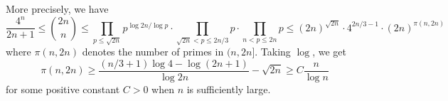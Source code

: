 \documentclass{article}
\def\Z{{\mathbb Z}}
\def\Z{{\mathbb Z}}
\newtheorem{cor}[subsection]{Corollary}
\newenvironment{proof}{\noindent {\bf Proof:}}{$\Box$ \vspace{2 ex}}
\begin{document}
\begin{comment}
Let's now consider the binomial coefficient $\displaystyle\binom{2n}{n}$. For any positive integer $a$, write $(2n)_a$ and $n_a$ for the remainders as last time. We note that if $n_a < a/2$, then $(2n)_a = 2(n_a) \geq n_a$; and if $n_a \geq a/2$, then $(2n)_a = 2(n_a) - a < n_a$. Hence
$$\left\lfloor\frac{2n}{a}\right\rfloor - 2\left\lfloor\frac{n}{a}\right\rfloor = \begin{cases}
        1&\mbox{if }n_a \geq a/2,\\
        0&\mbox{if }n_a < a/2.
    \end{cases}$$

\begin{cor}
    For any positive integer $n$, we have $\displaystyle n+1 \mid \binom{2n}{n}$. The quotients $\displaystyle\frac{1}{n+1}\binom{2n}{n}$ are the Catalan numbers.
\end{cor}

\begin{proof}
    One can prove this directly by checking that
    $$\frac{1}{n+1}\binom{2n}{n} = \binom{2n}{n} - \binom{2n}{n+1} \in\Z.$$
    Alternatively, suppose $\nu_p(n+1) = k$. Then for any $a = p,p^2,\ldots,p^k$, we have $n_a = a - 1\geq a/2$. So $\nu_p(\binom{2n}{n}) \geq k.$
\end{proof}

\begin{cor}
    Let $n\geq3$ and let $p$ be a prime such that $2n/3 < p \leq 2n$. Then
    $$\nu_p\left(\binom{2n}{n}\right) = \begin{cases}
        1&\mbox{if }n < p \leq 2n\\
        0&\mbox{if }2n/3 < p \leq n
    \end{cases}$$
\end{cor}

\begin{proof}
    The statement for $n<p\leq 2n$ is obvious because $\lfloor 2n/p\rfloor = 1$ and $\lfloor n/p\rfloor = 0$. Suppose now $2n/3 < p \leq n$. Then $n-p <3p/2-p = p/2$. So $\lfloor\frac{2n}{p}\rfloor - 2\lfloor\frac{n}{p}\rfloor = 0$. Now $p^2 > 4n^2/9 \geq 2n$ for $n\geq 5.$ When $n = 4$, we have $8/3 < p \leq 4$ and so $p = 3$ and $p^2 > 2n$. When $n = 3$, we have $2 < p \leq 3$ and so $p = 3$ and $p^2 > 2n$. 
\end{proof}

For primes $p \leq 2n/3$, we have the ``trivial'' bound
$$\nu_p\left(\binom{2n}{n}\right) \leq \frac{\log 2n}{\log p}.$$
Note for $\sqrt{2n}<p\leq 2n/3$, we have 
$$\nu_p\left(\binom{2n}{n}\right) \leq \frac{\log 2n}{\log p} < 2\qquad\Longrightarrow\qquad \nu_p\left(\binom{2n}{n}\right) = 1.$$
\end{comment}
More precisely, we have
$$\frac{4^n}{2n+1}\leq \binom{2n}{n} \leq \prod_{p\leq \sqrt{2n}} p^{\log 2n/\log p} \cdot \prod_{\sqrt{2n} < p\leq 2n/3} p\cdot\prod_{n < p \leq 2n}p \leq (2n)^{\sqrt{2n}} \cdot 4^{2n/3-1} \cdot (2n)^{\pi(n,2n)}$$
where $\pi(n,2n)$ denotes the number of primes in $(n, 2n]$. Taking $\log$, we get
$$\pi(n, 2n) \geq \frac{(n/3+1)\log 4 - \log(2n+1)}{\log 2n} - \sqrt{2n} \geq C \frac{n}{\log n}$$
for some positive constant $C>0$ when $n$ is sufficiently large.
\end{document}
